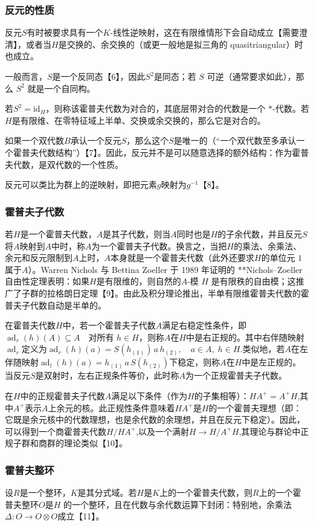 \subsubsection{反元的性质}
反元$S$有时被要求具有一个$K$-线性逆映射，这在有限维情形下会自动成立【需要澄清】，或者当$H$是交换的、余交换的（或更一般地是拟三角的 quasitriangular）时也成立。

一般而言，$S$是一个反同态【6】，因此$S^2$是同态；若 $S$ 可逆（通常要求如此），那么 $S^2$ 就是一个自同构。

若$S^2 = \mathrm{id}_H$，则称该霍普夫代数为对合的，其底层带对合的代数是一个 $*$-代数。若$H$是有限维、在零特征域上半单、交换或余交换的，那么它是对合的。

如果一个双代数$B$承认一个反元$S$，那么这个$S$是唯一的（“一个双代数至多承认一个霍普夫代数结构”）【7】。因此，反元并不是可以随意选择的额外结构：作为霍普夫代数，是双代数的一个性质。

反元可以类比为群上的逆映射，即把元素$g$映射为$g^{-1}$【8】。
\subsubsection{霍普夫子代数}
若$H$是一个霍普夫代数，$A$是其子代数，则当$A$同时也是$H$的子余代数，并且反元$S$将$A$映射到$A$中时，称$A$为一个霍普夫子代数。换言之，当把$H$的乘法、余乘法、余元和反元限制到$A$上时，$A$本身就是一个霍普夫代数（此外还要求$H$的单位元 $1$属于$A$）。Warren Nichols 与 Bettina Zoeller 于 1989 年证明的 **Nichols–Zoeller 自由性定理表明：如果$H$是有限维的，则自然的$A$-模 $H$ 是有限秩的自由模；这推广了子群的拉格朗日定理【9】。由此及积分理论推出，半单有限维霍普夫代数的霍普夫子代数自动是半单的。

在霍普夫代数$H$中，若一个霍普夫子代数$A$满足右稳定性条件，即$\operatorname{ad}_r(h)(A) \subseteq A \quad \text{对所有 } h \in H$，则称$A$在$H$中是右正规的。其中右伴随映射$\operatorname{ad}_r$定义为$\operatorname{ad}_r(h)(a) = S(h_{(1)})\, a \, h_{(2)}, \quad a \in A, \; h \in H$.类似地，若$A$在左伴随映射$\operatorname{ad}_l(h)(a) = h_{(1)}\, a \, S(h_{(2)})$下稳定，则称$A$在$H$中是左正规的。当反元$S$是双射时，左右正规条件等价，此时称$A$为一个正规霍普夫子代数。

在$H$中的正规霍普夫子代数$A$满足以下条件（作为$H$的子集相等）：$H A^{+} = A^{+} H$,其中$A^{+}$表示$A$上余元的核。此正规性条件意味着$H A^{+}$是$H$的一个霍普夫理想（即：它既是余元核中的代数理想，也是余代数的余理想，并且在反元下稳定）。因此，可以得到一个商霍普夫代数$H / H A^{+}$,以及一个满射$H \to H / A^{+} H$,其理论与群论中正规子群和商群的理论类似【10】。
\subsubsection{霍普夫整环}
设$R$是一个整环，$K$是其分式域。若$H$是$K$上的一个霍普夫代数，则$R$上的一个霍普夫整环$O$是$H$ 的一个整环，且在代数与余代数运算下封闭：特别地，余乘法$\Delta : O \to O \otimes O$成立【11】。
